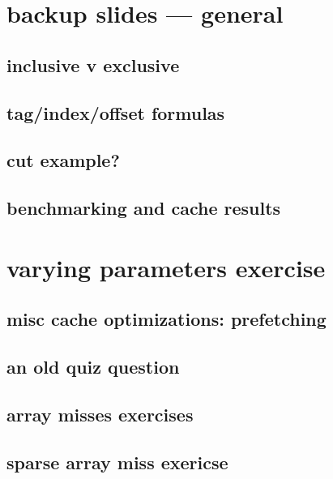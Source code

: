 
\section{backup slides --- general}



\subsection{inclusive v exclusive}


\subsection{tag/index/offset formulas}


\subsection{cut example?}


\subsection{benchmarking and cache results}



\section{varying parameters exercise}


\subsection{misc cache optimizations: prefetching}


\subsection{an old quiz question}



\subsection{array misses exercises}

\subsection{sparse array miss exericse}


